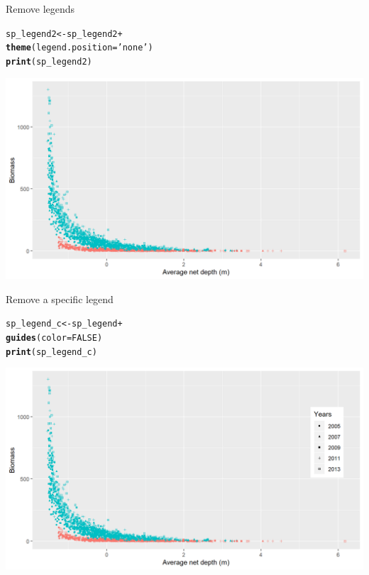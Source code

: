 \documentclass{beamer}\usepackage[]{graphicx}\usepackage[]{color}
\makeatletter
\newcommand{\hlnum}[1]{\textcolor[rgb]{0.686,0.059,0.569}{#1}}%
\newcommand{\hlstr}[1]{\textcolor[rgb]{0.192,0.494,0.8}{#1}}%
\newcommand{\hlopt}[1]{\textcolor[rgb]{0,0,0}{#1}}%
\newcommand{\hlstd}[1]{\textcolor[rgb]{0.345,0.345,0.345}{#1}}%
\newcommand{\hlkwb}[1]{\textcolor[rgb]{0.69,0.353,0.396}{#1}}%
\newcommand{\hlkwc}[1]{\textcolor[rgb]{0.333,0.667,0.333}{#1}}%
\newcommand{\hlkwd}[1]{\textcolor[rgb]{0.737,0.353,0.396}{\textbf{#1}}}%
\newenvironment{kframe}{%
 \def\at@end@of@kframe{}%
 \ifinner\ifhmode%
  \def\at@end@of@kframe{\end{minipage}}%
  \begin{minipage}{\columnwidth}%
 \fi\fi%
 \def\FrameCommand##1{\hskip\@totalleftmargin \hskip-\fboxsep
 \colorbox{shadecolor}{##1}\hskip-\fboxsep
     \hskip-\linewidth \hskip-\@totalleftmargin \hskip\columnwidth}%
 \MakeFramed {\advance\hsize-\width
   \@totalleftmargin\z@ \linewidth\hsize
   \@setminipage}}%
 {\par\unskip\endMakeFramed%
 \at@end@of@kframe}
\newenvironment{knitrout}{}{} %
\makeatother
\begin{document}
\begin{frame}[fragile]{Remove legends}
\begin{knitrout}\footnotesize
{}\color{fgcolor}\begin{kframe}
\begin{alltt}
\hlstd{sp_legend2} \hlkwb{<-} \hlstd{sp_legend2}  \hlopt{+}
  \hlkwd{theme}\hlstd{(}\hlkwc{legend.position}\hlstd{=}\hlstr{'none'}\hlstd{)}
\hlkwd{print}\hlstd{(sp_legend2)}
\end{alltt}
\end{kframe}

{\centering \includegraphics[width=.9\linewidth]{figure/legend_rm-1} 

}



\end{knitrout}
\end{frame}

\begin{frame}[fragile]{Remove a specific legend}
\begin{knitrout}\footnotesize
{}\color{fgcolor}\begin{kframe}
\begin{alltt}
\hlstd{sp_legend_c} \hlkwb{<-} \hlstd{sp_legend} \hlopt{+}
  \hlkwd{guides}\hlstd{(}\hlkwc{color} \hlstd{=} \hlnum{FALSE}\hlstd{)}
\hlkwd{print}\hlstd{(sp_legend_c)}
\end{alltt}
\end{kframe}

{\centering \includegraphics[width=.9\linewidth]{figure/legend_rm2-1} 

}



\end{knitrout}
\end{frame}
\end{document}
